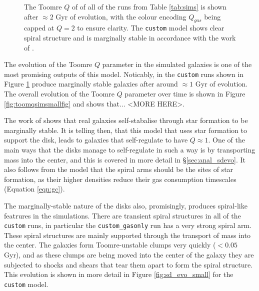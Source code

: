 \begin{figure}[!ht]
    \leavevmode\rlap{\usebox{\graphicsbox}}%
    \begin{minipage}[b]{0.63\wd\graphicsbox}%
        \caption{The Toomre $Q$ of of all of the runs from Table \ref{tab:sims} is shown after $\approx 2$ Gyr of evolution, with the colour encoding $Q_{gas}$ being capped at $Q=2$ to ensure clarity. The {\tt custom} model shows clear spiral structure and is marginally stable in accordance with the work of \citet{hopkins_stellar_2012}.}
        \label{fig:toomqsimbigfig}
    \end{minipage}\hspace*{0.33\wd\graphicsbox}%
\end{figure}

The evolution of the Toomre $Q$ parameter in the simulated galaxies is one of the most promising outputs of this model.
Noticably, in the {\tt custom} runs shown in Figure \ref{fig:toomqsimbigfig} produce marginally stable galaxies after around $\approx 1$ Gyr of evolution.
The overall evolution of the Toomre $Q$ parameter over time is shown in Figure \ref{fig:toomqsimsmallfig} and shows that... <MORE HERE>.

The work of \citet{hopkins_stellar_2012} shows that real galaxies self-stabalise through star formation to be marginally stable.
It is telling then, that this model that uses star formation to support the disk, leads to galaxies that self-regulate to have $Q\approx1$.
One of the main ways that the disks manage to self-regulate in such a way is by transporting mass into the center, and this is covered in more detail in \S \ref{sec:anal_sdevo}.
It also follows from the model that the spiral arms should be the sites of star formation, as their higher densities reduce their gas consumption timescales (Equation \ref{eqn:gc}).

The marginally-stable nature of the disks also, promisingly, produces spiral-like featrures in the simulations.
There are transient spiral structures in all of the {\tt custom} runs, in particular the {\tt custom\_gasonly} run has a very strong spiral arm.
These spiral structures are mainly supported through the transport of mass into the center.
The galaxies form Toomre-unstable clumps very quickly ($<0.05$ Gyr), and as these clumps are being moved into the center of the galaxy they are subjected to shocks and shears that tear them apart to form the spiral structure.
This evolution is shown in more detail in Figure \ref{fig:sd_evo_small} for the {\tt custom} model.

